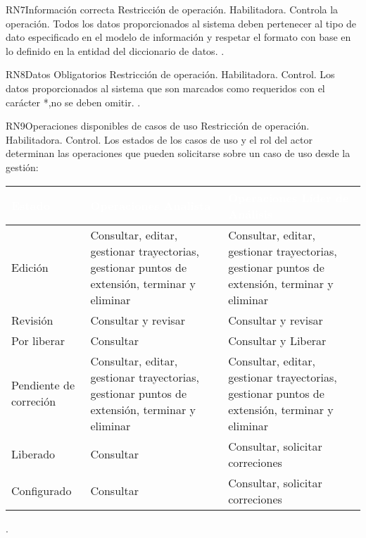 \begin{BussinesRule}{RN7}{Información correcta}
	\BRitem[Tipo:] Restricción de operación. 
	\BRitem[Clase:] Habilitadora. 
	\BRitem[Nivel:] Controla la operación. %
	\BRitem[Descripción:]	Todos los datos proporcionados al sistema deben pertenecer al tipo de dato especificado en el modelo de información y respetar el formato con base en lo definido en la entidad del diccionario de datos.
	 .
\end{BussinesRule}

\begin{BussinesRule}{RN8}{Datos Obligatorios} 
	\BRitem[Tipo:] Restricción de operación. 
	\BRitem[Clase:] Habilitadora. 
	\BRitem[Nivel:] Control. %
	\BRitem[Descripción:] Los datos proporcionados al sistema que son marcados como requeridos con el carácter *,no se deben omitir.
	 . 
\end{BussinesRule}



\begin{BussinesRule}{RN9}{Operaciones disponibles de casos de uso} 
	\BRitem[Tipo:] Restricción de operación. 
	\BRitem[Clase:] Habilitadora. 
	\BRitem[Nivel:] Control. %
	\BRitem[Descripción:] Los estados de los casos de uso y el rol del actor determinan las operaciones que pueden solicitarse sobre un caso de uso desde la gestión:
	
	\begin{table}[H]
		\centering
		\begin{tabular}{|p{5cm}| p{5cm}| p{5cm}|}
			\hline
			\rowcolor{blue} \textcolor{white}{\textbf{Estado}} & \textcolor{white}{\textbf{Operaciones Analista}} & \textcolor{white}{\textbf{Operaciones Líder de Análisis}} \\
			\hline
			Edición & Consultar, editar, gestionar trayectorias, gestionar puntos de extensión, terminar y eliminar & Consultar, editar, gestionar trayectorias, gestionar puntos de extensión, terminar y eliminar \\
			\hline
			Revisión & Consultar y revisar & Consultar y revisar\\
			\hline
			Por liberar & Consultar & Consultar y Liberar\\
			\hline
			Pendiente de correción & Consultar, editar, gestionar trayectorias, gestionar puntos de extensión, terminar y eliminar & Consultar, editar, gestionar trayectorias, gestionar puntos de extensión, terminar y eliminar\\
			\hline
			Liberado & Consultar & Consultar, solicitar correciones\\
			\hline
			Configurado & Consultar & Consultar, solicitar correciones\\
			\hline
		\end{tabular}
	\end{table}

	 \UCref{}{}.
	
\end{BussinesRule}
	
